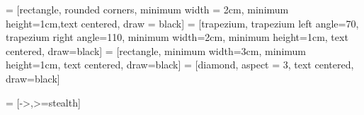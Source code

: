 
	
	 = [rectangle, rounded corners, minimum width = 2cm, minimum height=1cm,text centered, draw = black]
	 = [trapezium, trapezium left angle=70, trapezium right angle=110, minimum width=2cm, minimum height=1cm, text centered, draw=black]
	 = [rectangle, minimum width=3cm, minimum height=1cm, text centered, draw=black]
	 = [diamond, aspect = 3, text centered, draw=black]
	
	 = [->,>=stealth]
	
	
%	
